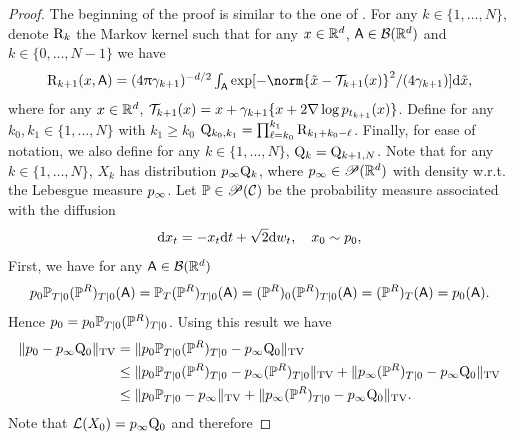 \begin{proof}
  The beginning of the proof is similar to the one of \cite[Theorem
  1]{debortoli2021diffusion}.  For any $k \in \{1, \dots, N\}$, denote $\mathrm{R}_k$
  the Markov kernel such that for any $x \in \mathbb{R}^d$, $\mathsf{A} \in \mathcal{B}(\mathbb{R}^d)$
  and $k \in \{0, \dots, N-1\}$ we have
    \begin{equation}
      \textstyle{\Rker_{k+1}(x, \msa) = (4 \uppi \gamma_{k+1})^{-d/2} \int_{\msa} \exp[-\norm{\tilde{x} - \Tnplusun(x)}^2/(4 \gamma_{k+1})] \rmd \tilde{x}  , }
    \end{equation}
    where for any $x \in \mathbb{R}^d$,
    $\mathcal{T}_{k+1}(x) = x + \gamma_{k+1} \lbrace x + 2 \nabla \log
      p_{t_{k+1}}(x) \rbrace$. Define for any $k_0, k_1 \in \{1, \dots, N\}$ with
    $k_1 \geq k_0$ $\mathrm{Q}_{k_0, k_1} = \prod_{\ell = k_0}^{k_1}
    \mathrm{R}_{k_1 + k_0 - \ell}$. Finally, for ease of notation, we also define for any
    $k \in \{1, \dots, N\}$, $\mathrm{Q}_k = \mathrm{Q}_{k+1,N}$. Note that for any
    $k \in \{1, \dots, N\}$, $X_k$ has distribution $p_{\infty} \mathrm{Q}_k$,
    where $p_{\infty}\in \mathscr{P}(\mathbb{R}^d)$ with density w.r.t. the Lebesgue
    measure $p_{\infty}$. Let $\mathbb{P} \in \mathscr{P}(\mathcal{C})$ be the probability measure
    associated with the diffusion
    \begin{equation}
      \mathrm{d} x_t = - x_t \mathrm{d} t + \sqrt{2} \mathrm{d} w_t  , \quad x_0 \sim p_0  , 
    \end{equation}
    First, we have for any $\mathsf{A} \in \mathcal{B}(\mathbb{R}^d)$
    \begin{equation}
      p_0 \mathbb{P}_{T|0} (\mathbb{P}^R)_{T|0} (\mathsf{A}) = \mathbb{P}_T (\mathbb{P}^R)_{T|0} (\mathsf{A}) = (\mathbb{P}^R)_0 (\mathbb{P}^R)_{T|0} (\mathsf{A})  = (\mathbb{P}^R)_T(\mathsf{A}) = p_0(\mathsf{A})  . 
    \end{equation}
    Hence $p_0 = p_0 \mathbb{P}_{T|0} (\mathbb{P}^R)_{T|0}$.  Using this result %
    we have
    \begin{align}
      \| p_0 - p_{\infty} \mathrm{Q}_0 \|_{\mathrm{TV}} &= \| p_0 \mathbb{P}_{T|0} (\mathbb{P}^R)_{T|0} - p_{\infty} \mathrm{Q}_0 \|_{\mathrm{TV}} \\
                                         &\leq \| p_0 \mathbb{P}_{T|0} (\mathbb{P}^R)_{T|0} - p_{\infty} (\mathbb{P}^R)_{T|0} \|_{\mathrm{TV}} +\| p_{\infty} (\mathbb{P}^R)_{T|0} - p_{\infty} \mathrm{Q}_0 \|_{\mathrm{TV}} \\
          &\leq \| p_0 \mathbb{P}_{T|0}- p_{\infty} \|_{\mathrm{TV}} +\| p_{\infty} (\mathbb{P}^R)_{T|0} - p_{\infty} \mathrm{Q}_0 \|_{\mathrm{TV}}  .                                  
    \end{align}
    Note that $\mathcal{L}(X_0)= p_{\infty} \mathrm{Q}_0$ and therefore

\end{proof}
